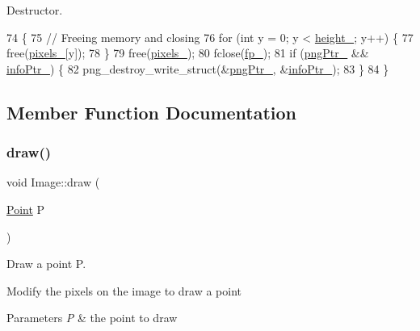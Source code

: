 Destructor. 


\begin{DoxyCode}
74               \{
75     \textcolor{comment}{// Freeing memory and closing}
76     \textcolor{keywordflow}{for} (\textcolor{keywordtype}{int} y = 0; y < \mbox{\hyperlink{class_image_a64a699c5bb8e8a18c6971a8032806dba}{height\_}}; y++) \{
77         free(\mbox{\hyperlink{class_image_a51351c8507499d09cb9667c20ef01faf}{pixels\_}}[y]);
78     \}
79     free(\mbox{\hyperlink{class_image_a51351c8507499d09cb9667c20ef01faf}{pixels\_}});
80     fclose(\mbox{\hyperlink{class_image_a4d43b19efb469f7c9fb65e7202d7ba7f}{fp\_}});
81     \textcolor{keywordflow}{if} (\mbox{\hyperlink{class_image_aaf607d2596bac09b13370599d9ba6d8c}{pngPtr\_}} \&\& \mbox{\hyperlink{class_image_a505878e5e19500e3cc1b940067faa584}{infoPtr\_}}) \{
82         png\_destroy\_write\_struct(\&\mbox{\hyperlink{class_image_aaf607d2596bac09b13370599d9ba6d8c}{pngPtr\_}}, \&\mbox{\hyperlink{class_image_a505878e5e19500e3cc1b940067faa584}{infoPtr\_}});
83     \}
84 \}
\end{DoxyCode}


\subsection{Member Function Documentation}
\mbox{\label{class_image_a8d162f3cab956131d58708c09aa560b0}} 
\subsubsection{\texorpdfstring{draw()}{draw()}\hspace{0.1cm}{\footnotesize\ttfamily [1/3]}}
{\footnotesize\ttfamily void Image\+::draw (\begin{DoxyParamCaption}\item[{\mbox{\hyperlink{class_point}{Point}}}]{P }\end{DoxyParamCaption})}



Draw a point P. 

Modify the pixels on the image to draw a point 
\begin{DoxyParams}{Parameters}
{\em P} & the point to draw \\
\hline
\end{DoxyParams}

